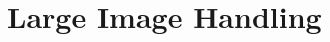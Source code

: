 \documentclass[../Head/Main.tex]{subfiles}
\begin{document}
\section{Large Image Handling}
\end{document}
